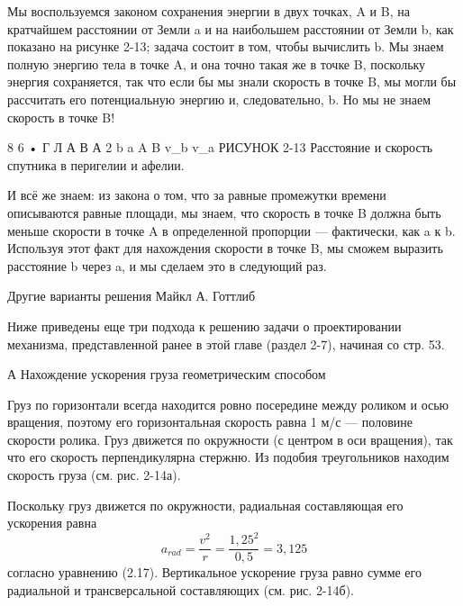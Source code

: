 \documentclass[10pt,oneside]{article}
\newcommand{\TipsRunning}[1]{\par\vspace{2bp}{\centering\footnotesize #1\par}\vspace{2bp}}
\begin{document}
Мы воспользуемся законом сохранения энергии в двух точках, A и B, на кратчайшем расстоянии от Земли a и на наибольшем расстоянии от Земли b, как показано на рисунке 2-13; задача состоит в том, чтобы вычислить b. Мы знаем полную энергию тела в точке A, и она точно такая же в точке B, поскольку энергия сохраняется, так что если бы мы знали скорость в точке B, мы могли бы рассчитать его потенциальную энергию и, следовательно, b. Но мы не знаем скорость в точке B!\par

8 6 • Г Л А В А  2 b a A B v\_b v\_a РИСУНОК 2-13 Расстояние и скорость спутника в перигелии и афелии.\par

И всё же знаем: из закона о том, что за равные промежутки времени описываются равные площади, мы знаем, что скорость в точке B должна быть меньше скорости в точке A в определенной пропорции --- фактически, как a к b. Используя этот факт для нахождения скорости в точке B, мы сможем выразить расстояние b через a, и мы сделаем это в следующий раз.\par

\TipsRunning{З А К О Н Ы  И  И Н Т У И Ц И Я • 8 7 v 0,5 м 0,4 м 1 м/с v 1 0,5 0,4}

\TipsRunning{Р И С У Н О К  2 - 1 4}

Другие варианты решения Майкл А. Готтлиб\par

Ниже приведены еще три подхода к решению задачи о проектировании механизма, представленной ранее в этой главе (раздел 2-7), начиная со стр. 53.\par

А Нахождение ускорения груза геометрическим способом\par

Груз по горизонтали всегда находится ровно посередине между роликом и осью вращения, поэтому его горизонтальная скорость равна 1 м/с --- половине скорости ролика. Груз движется по окружности (с центром в оси вращения), так что его скорость перпендикулярна стержню. Из подобия треугольников находим скорость груза (см. рис. 2-14а).\par

Поскольку груз движется по окружности, радиальная составляющая его ускорения равна \[a_{rad} = \frac{v^2}{r} = \frac{1,25^2}{0,5} = 3,125\] согласно уравнению (2.17). Вертикальное ускорение груза равно сумме его радиальной и трансверсальной составляющих (см. рис. 2-14б).\par
\end{document}
